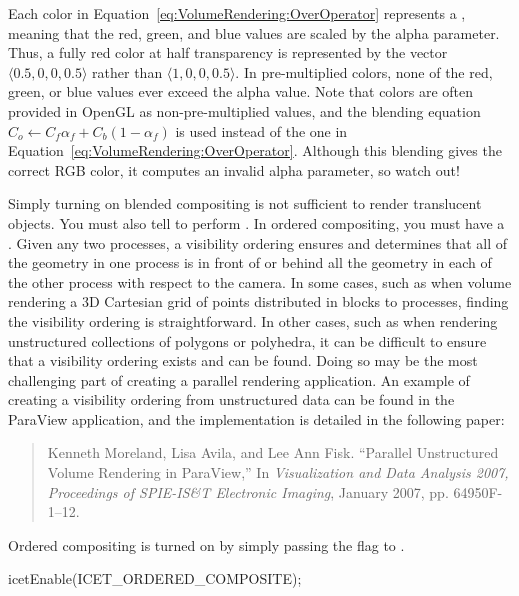 Each color in Equation~\ref{eq:VolumeRendering:OverOperator} represents a
, meaning that
the red, green, and blue values are scaled by the alpha parameter.  Thus, a
fully red color at half transparency is represented by the vector $\langle
0.5, 0, 0, 0.5 \rangle$ rather than $\langle 1, 0, 0, 0.5 \rangle$.  In
pre-multiplied colors, none of the red, green, or blue values ever exceed
the alpha value.  Note that colors are often provided in OpenGL as
non-pre-multiplied values, and the blending equation $C_o \leftarrow C_f
\alpha_f + C_b (1 - \alpha_f)$ is used instead of the one in
Equation~\ref{eq:VolumeRendering:OverOperator}.  Although this blending
gives the correct RGB color, it computes an invalid alpha parameter, so
watch out!


Simply turning on blended compositing is not sufficient to render
translucent objects.  You must also tell \IceT to perform .  In ordered compositing, you must have a
.  Given any two
processes, a visibility ordering ensures and determines that all of the
geometry in one process is in front of or behind all the geometry in each
of the other process with respect to the camera.  In some cases, such as
when volume rendering a 3D Cartesian grid of points distributed in blocks
to processes, finding the visibility ordering is straightforward.  In other
cases, such as when rendering unstructured collections of polygons or
polyhedra, it can be difficult to ensure that a visibility ordering exists
and can be found.  Doing so may be the most challenging part of creating a
parallel rendering application.  An example of creating a visibility
ordering from unstructured data can be found in the ParaView application,
and the implementation is detailed in the following paper:

\begin{quote}
  Kenneth Moreland, Lisa Avila, and Lee Ann Fisk. ``Parallel Unstructured
  Volume Rendering in ParaView,'' In \emph{Visualization and Data Analysis
    2007, Proceedings of SPIE-IS\&T Electronic Imaging}, January 2007,
  pp. 64950F-1--12.
\end{quote}

Ordered compositing is turned on by simply passing the
 flag to .
\begin{code}
  icetEnable(ICET_ORDERED_COMPOSITE);
\end{code}


